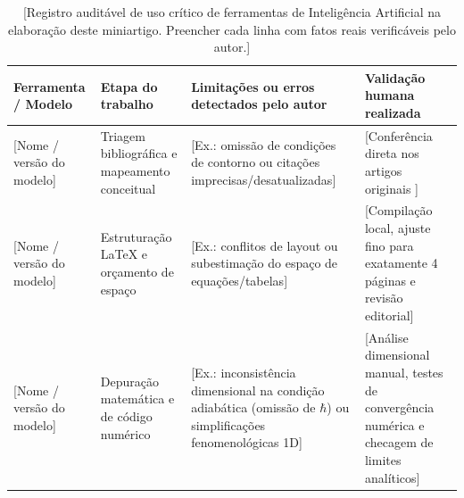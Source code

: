 \documentclass[aps,pre,twocolumn,10pt,superscriptaddress,nofootinbib]{revtex4-2}
\begin{document}
\begin{table}[t]
  \centering
  \caption{[Registro auditável de uso crítico de ferramentas de Inteligência Artificial na elaboração deste miniartigo. Preencher cada linha com fatos reais verificáveis pelo autor.]}
  \label{tab:uso_ia}
  \footnotesize
  \begin{tabular}{@{}p{}p{}p{}p{}@{}}
    \toprule
    \textbf{Ferramenta / Modelo} & \textbf{Etapa do trabalho} & \textbf{Limitações ou erros detectados pelo autor} & \textbf{Validação humana realizada} \\
    \midrule
    {[Nome / versão do modelo]} &
    Triagem bibliográfica e mapeamento conceitual &
    {[Ex.: omissão de condições de contorno ou citações imprecisas/desatualizadas]} &
    {[Conferência direta nos artigos originais \cite{Kirkpatrick1983,Kadowaki1998,Das2008,Albash2018,Chakrabarti2022}]} \\[4pt]
    {[Nome / versão do modelo]} &
    Estruturação \LaTeX{} e orçamento de espaço &
    {[Ex.: conflitos de layout ou subestimação do espaço de equações/tabelas]} &
    {[Compilação local, ajuste fino para exatamente 4 páginas e revisão editorial]} \\[4pt]
    {[Nome / versão do modelo]} &
    Depuração matemática e de código numérico &
    {[Ex.: inconsistência dimensional na condição adiabática (omissão de $\hbar$) ou simplificações fenomenológicas 1D]} &
    {[Análise dimensional manual, testes de convergência numérica e checagem de limites analíticos]} \\
    \bottomrule
  \end{tabular}
\end{table}



\end{document}
